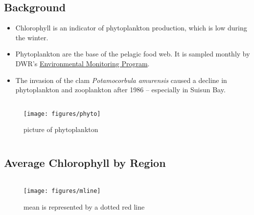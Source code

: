 \documentclass[
]{book}
\providecommand{\tightlist}{%
  \setlength{\itemsep}{0pt}\setlength{\parskip}{0pt}}
\begin{document}
\begin{columns-nocenter}

\begin{column}

\hypertarget{background-2}{%
\subsection{Background}\label{background-2}}

\begin{itemize}
\tightlist
\item
  Chlorophyll is an indicator of phytoplankton production, which is low during the winter.
\item
  Phytoplankton are the base of the pelagic food web. It is sampled monthly by DWR's \href{https://emp.baydeltalive.com/wiki/12297}{Environmental Monitoring Program}.
\item
  The invasion of the clam \emph{Potamocorbula amurensis} caused a decline in phytoplankton and zooplankton after 1986 -- especially in Suisun Bay.
\end{itemize}

\end{column}

\begin{column}

\begin{figure}

{\centering \texttt{[image: figures/phyto]} 

}

\caption{picture of phytoplankton}\label{fig:unnamed-chunk-156}
\end{figure}

\end{column}

\end{columns-nocenter}

\hypertarget{average-chlorophyll-by-region}{%
\subsection{Average Chlorophyll by Region}\label{average-chlorophyll-by-region}}

\begin{columns-nocenter}

\begin{column}

\begin{figure}
\texttt{[image: figures/mline]} \caption{mean is represented by a dotted red line}\label{fig:unnamed-chunk-157}
\end{figure}

\end{column}

\begin{column}

\end{column}

\begin{column}

\end{column}

\end{columns-nocenter}
\end{document}

